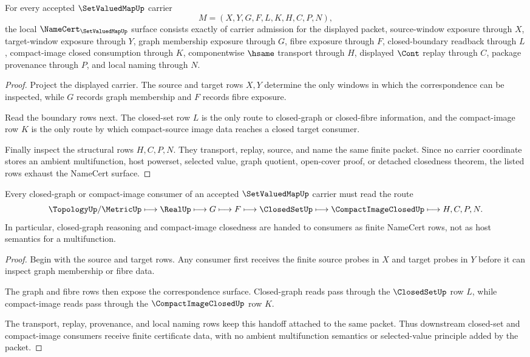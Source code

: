 \begin{theorem}
\label{thm:set-valued-map-namecert-obligations}
For every accepted $\SetValuedMapUp$ carrier
$$
M=(X,Y,G,F,L,K,H,C,P,N),
$$
the local $\NameCert_{\SetValuedMapUp}$ surface consists exactly of carrier admission for the displayed packet, source-window exposure through $X$, target-window exposure through $Y$, graph membership exposure through $G$, fibre exposure through $F$, closed-boundary readback through $L$, compact-image closed consumption through $K$, componentwise $\hsame$ transport through $H$, displayed $\Cont$ replay through $C$, package provenance through $P$, and local naming through $N$.
\end{theorem}
\begin{proof}
Project the displayed carrier. The source and target rows $X,Y$ determine the only windows in which the correspondence can be inspected, while $G$ records graph membership and $F$ records fibre exposure.

Read the boundary rows next. The closed-set row $L$ is the only route to closed-graph or closed-fibre information, and the compact-image row $K$ is the only route by which compact-source image data reaches a closed target consumer.

Finally inspect the structural rows $H,C,P,N$. They transport, replay, source, and name the same finite packet. Since no carrier coordinate stores an ambient multifunction, host powerset, selected value, graph quotient, open-cover proof, or detached closedness theorem, the listed rows exhaust the NameCert surface.
\end{proof}

\begin{theorem}
\label{thm:set-valued-map-closed-graph-handoff}
Every closed-graph or compact-image consumer of an accepted $\SetValuedMapUp$ carrier must read the route
$$
\TopologyUp/\MetricUp \longmapsto \RealUp \longmapsto G \longmapsto F \longmapsto \ClosedSetUp \longmapsto \CompactImageClosedUp \longmapsto H,C,P,N .
$$
In particular, closed-graph reasoning and compact-image closedness are handed to consumers as finite NameCert rows, not as host semantics for a multifunction.
\end{theorem}
\begin{proof}
Begin with the source and target rows. Any consumer first receives the finite source probes in $X$ and target probes in $Y$ before it can inspect graph membership or fibre data.

The graph and fibre rows then expose the correspondence surface. Closed-graph reads pass through the $\ClosedSetUp$ row $L$, while compact-image reads pass through the $\CompactImageClosedUp$ row $K$.

The transport, replay, provenance, and local naming rows keep this handoff attached to the same packet. Thus downstream closed-set and compact-image consumers receive finite certificate data, with no ambient multifunction semantics or selected-value principle added by the packet.
\end{proof}

